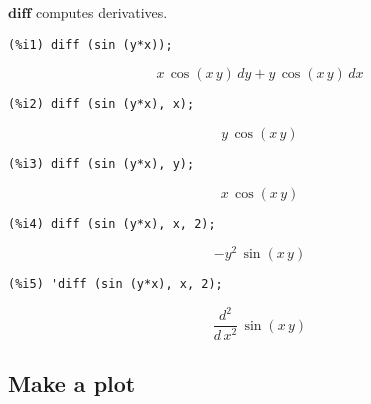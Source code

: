 \documentclass[12pt,leqno]{article}
\begin{document}
$\mathbf{diff}$ computes derivatives.
\begin{verbatim}
(%i1) diff (sin (y*x));
\end{verbatim}
\begin{equation}
x\,\cos \left(x\,y\right)\,dy+y\,\cos \left(x\,y\right)\,dx\tag{\%o1}
\label{eq:doc-group1-code30-1-1}
\end{equation}
\begin{verbatim}
(%i2) diff (sin (y*x), x);
\end{verbatim}
\begin{equation}
y\,\cos \left(x\,y\right)\tag{\%o2}
\label{eq:doc-group1-code30-2-1}
\end{equation}
\begin{verbatim}
(%i3) diff (sin (y*x), y);
\end{verbatim}
\begin{equation}
x\,\cos \left(x\,y\right)\tag{\%o3}
\label{eq:doc-group1-code30-3-1}
\end{equation}
\begin{verbatim}
(%i4) diff (sin (y*x), x, 2);
\end{verbatim}
\begin{equation}
-y^2\,\sin \left(x\,y\right)\tag{\%o4}
\label{eq:doc-group1-code30-4-1}
\end{equation}
\begin{verbatim}
(%i5) 'diff (sin (y*x), x, 2);
\end{verbatim}
\begin{equation}
\frac{d^2}{d\,x^2}\,\sin \left(x\,y\right)\tag{\%o5}
\label{eq:doc-group1-code30-5-1}
\end{equation}


\subsection{Make a plot}
\end{document}
